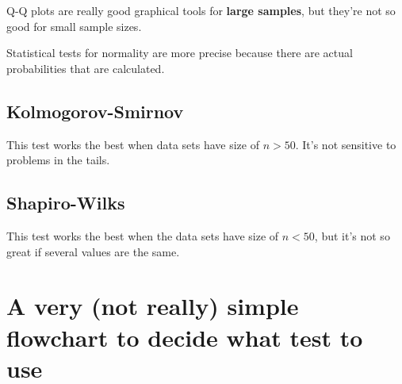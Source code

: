 \documentclass[11pt,a4paper,titlepage]{scrartcl}
\begin{document}
Q-Q plots are really good graphical tools for \textbf{large samples}, but they're
not so good for small sample sizes.

Statistical tests for normality are more precise because there are actual
probabilities that are calculated.

\subsection{Kolmogorov-Smirnov}%
\label{sub:Kolmogorov-Smirnov}

This test works the best when data sets have size of $n > 50$. It's not
sensitive to problems in the tails.

\subsection{Shapiro-Wilks}%
\label{sub:Shapiro-Wilks}
This test works the best when the data sets have size of $n < 50$, but
it's not so great if several values are the same.

\section{A very (not really) simple flowchart to decide what test to use}%
\label{sec:help}
\end{document}
